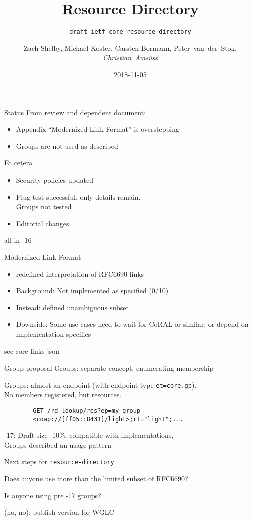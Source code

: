 \documentclass[aspectratio=169]{beamer}
\title{Resource Directory}
\subtitle{\texttt{draft-ietf-core-resource-directory}}
\author{Zach Shelby, Michael Koster, Carsten Bormann, Peter~van~der~Stok, \textit{Christian~Amsüss}}
\date{2018-11-05}
\begin{document}
\frame{\titlepage}

\begin{frame}{Status}\Large
	From review and dependent document:
	\begin{itemize}
		\item Appendix “Modernized Link Format” is overstepping
		\item Groups are not used as described
	\end{itemize}
\end{frame}

\begin{frame}{Et cetera}\Large
	\begin{itemize}
		\item Security policies updated
		\item Plug test successful, only details remain,\\
			Groups not tested
		\item Editorial changes
	\end{itemize}

	\bigskip

	all in -16
\end{frame}

\begin{frame}{\st{Modernized Link Format}}\Large
	\begin{itemize}
		\item redefined interpretation of RFC6690 links
		\item Background: Not implemented as specified (0/10)
		\item Instead: defined unambiguous subset
		\item Downside: Some use cases need to wait for CoRAL or similar, or depend on implementation specifics
	\end{itemize}
	\bigskip
	see core-links-json
\end{frame}

\begin{frame}[fragile]{Group proposal}\Large
	\st{Groups: separate concept, enumerating membership}

	\bigskip

	Groups: almost an endpoint (with endpoint type \texttt{et=core.gp}).\\No members registered, but resources.

	\pause\bigskip

	\begin{verbatim}
		GET /rd-lookup/res?ep=my-group
		<coap://[ff05::8431]/light>;rt="light";...
	\end{verbatim}

	\pause\bigskip

	-17: Draft size -10\%, compatible with implementations,\\Groups described an usage pattern
\end{frame}

\begin{frame}{Next steps for \texttt{resource-directory}}\begin{center}\Large
	Does anyone use more than the limited subset of RFC6690?

	\vspace{1cm}

	Is anyone using pre -17 groups?

	\vspace{1cm}

	(no, no): publish version for WGLC
\end{center}\end{frame}
\end{document}

